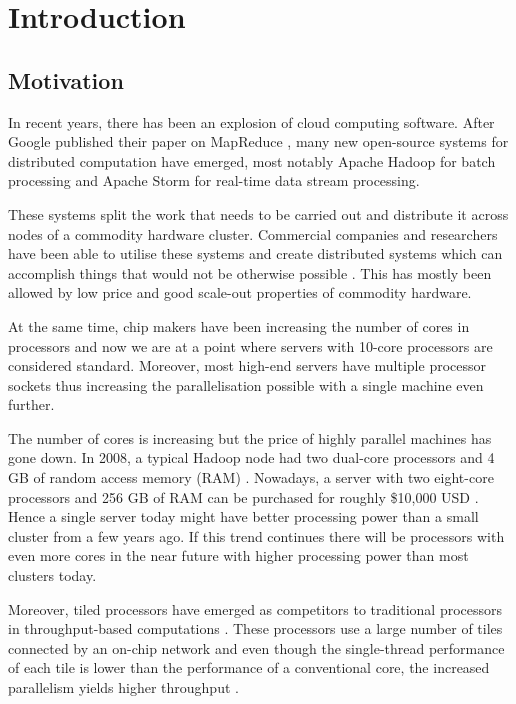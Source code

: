 \documentclass[bsc,deptreport,twoside,singlespacing,normalheadings,parskip]{infthesis}\usepackage[]{graphicx}\usepackage[]{color}
\begin{document}
\cleardoublepage
{}

\clearpage{}\chapter{Introduction}

\section{Motivation}

In recent years, there has been an explosion of cloud computing software. After Google published their paper on MapReduce \citep{dean2010mapreduce}, many new open-source systems for distributed computation have emerged, most notably Apache Hadoop \citep{ApacheHadoop} for batch processing and Apache Storm \citep{ApacheStorm} for real-time data stream processing.

These systems split the work that needs to be carried out and distribute it across nodes of a commodity hardware cluster. Commercial companies and researchers have been able to utilise these systems and create distributed systems which can accomplish things that would not be otherwise possible \cite{Solovey, Bifet:2010:MMO:1756006.1859903}. This has mostly been allowed by low price and good scale-out properties of commodity hardware.

At the same time, chip makers have been increasing the number of cores in processors and now we are at a point where servers with 10-core processors are considered standard. Moreover, most high-end servers have multiple processor sockets thus increasing the parallelisation possible with a single machine even further.

The number of cores is increasing but the price of highly parallel machines has gone down. In 2008, a typical Hadoop node had two dual-core processors and 4 GB of random access memory (RAM) \citep{Kumar:2013:HSD:2536274.2536314}. Nowadays, a server with two eight-core processors and 256 GB of RAM can be purchased for roughly \$10,000 USD \citep{Kumar:2013:HSD:2536274.2536314}. Hence a single server today might have better processing power than a small cluster from a few years ago. If this trend continues there will be processors with even more cores in the near future with higher processing power than most clusters today.

Moreover, tiled processors have emerged as competitors to traditional processors in throughput-based computations \cite{Tilera}. These processors use a large number of tiles connected by an on-chip network and even though the single-thread performance of each tile is lower than the performance of a conventional core, the increased parallelism yields higher throughput \cite{DBLP:conf/isca/Lotfi-KamranGFVKPAJIOF12}.
\end{document}

